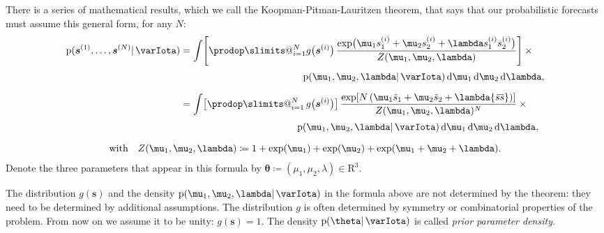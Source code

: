 \documentclass[\ifafour a4paper,12pt,\else a5paper,10pt,\fi%
onecolumn,oneside,article,%
british%
]{memoir}
\makeatletter
\theoremstyle{remark}
\theoremstyle{innote}
\def\prod{\DOTSI\prodop\slimits@}
\newcommand*{\di}{\mathrm{d}}%
\newcommand*{\RR}{\bm{\mathrm{R}}}
\newcommand*{\defd}{\coloneqq}
\newcommand*{\pf}{\mathrm{p}}%
\renewcommand*{\|}{\mathpunct{|}}
\newcommand*{\tprod}{\mathop{\textstyle\prod}\nolimits}
\newcommand*{\widebar}[1]{{\mkern1.5mu\skew{2}\overline{\mkern-1.5mu#1\mkern-1.5mu}\mkern 1.5mu}}
\newcommand*{\yI}{\varIota}
\newcommand*{\ys}{\bm{s}}
\newcommand*{\yso}[1]{\ys^{(#1)}}
\newcommand*{\ysso}[1]{s^{(#1)}}
\newcommand*{\la}{\lambda}
\newcommand*{\yth}{\bm{\theta}}
\newcommand*{\yavv}{\widebar{s}}
\newcommand*{\ycv}{\widebar{ss}}
\makeatother
\begin{document}
There is a series of mathematical results, which we call the
Koopman-Pitman-Lauritzen theorem, that says that our probabilistic
forecasts must assume this general form, for any $N$:
\begin{multline}
  \label{eq:predictive_KP}
\begin{aligned}
    \pf(\yso{1}, \dotsc, \yso{N} \|\yI )
  &=\!\!
    \begin{multlined}[t][0.7\linewidth]
\int
\Biggl[  \prod_{i=1}^{N}
  g\bigl(\yso{i}\bigr)\,
  \frac{  \exp\bigl(
    \mu_1 \ysso{i}_1 + \mu_2 \ysso{i}_2 + \la \ysso{i}_1 \ysso{i}_2
    \bigr) }{Z(\mu_1,\mu_2,\la)}
  \Biggr]\times{}\\[\jot]
  \pf(\mu_1,\mu_2,\la \| \yI) \, \di\mu_1\,\di\mu_2\,\di\la,
\end{multlined}
\\[2\jot]
  &=\!\!
        \begin{multlined}[t][0.7\linewidth]
\int
  \bigl[\tprod_{i=1}^{N}g\bigl(\yso{i}\bigr) \bigr]\,
  \frac{  \exp[N \, (
    \mu_1 \yavv_1 + \mu_2 \yavv_2 + \la \ycv)]}{Z(\mu_1,\mu_2,\la)^N}
  \times{}\\[\jot]
  \pf(\mu_1,\mu_2,\la \| \yI) \, \di\mu_1\,\di\mu_2\,\di\la,
\end{multlined}
\end{aligned}
\\[2\jot]
  \text{with}\quad
  Z(\mu_1,\mu_2,\la) \defd
  1+ \exp(\mu_1) + \exp(\mu_2) + \exp(\mu_1+\mu_2+\la).
\end{multline}
Denote the three parameters that appear in this formula by
$\yth \defd (\mu_1, \mu_2, \la)\in \RR^3$.

The distribution $g(\ys)$ and the density $\pf(\mu_1,\mu_2,\la \| \yI)$ in
the formula above are not determined by the theorem: they need to be
determined by additional assumptions. The distribution $g$ is often
determined by symmetry or combinatorial properties of the problem.
From now on we assume it to be unity: $g(\ys)=1$. The density
$\pf(\yth \|\yI)$ is called \emph{prior parameter density}.
\end{document}

